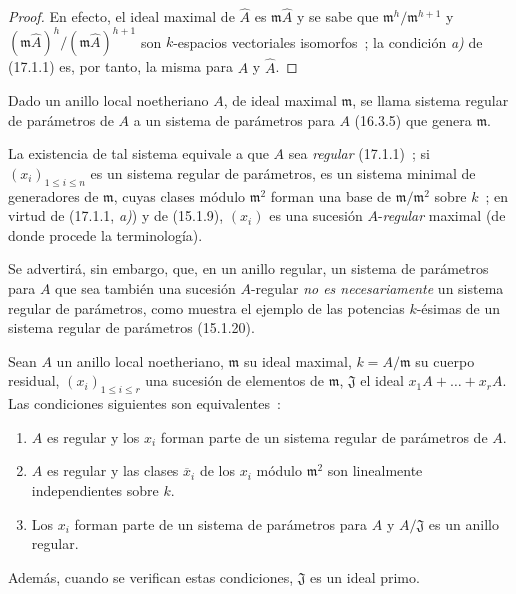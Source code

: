 \begin{proof}
En efecto, el ideal maximal de $\widehat{A}$ es $\mathfrak{m}\widehat{A}$ y se
sabe que $\mathfrak{m}^h/\mathfrak{m}^{h+1}$ y
$(\mathfrak{m}\widehat{A})^h/(\mathfrak{m}\widehat{A})^{h+1}$ son
$k$-espacios vectoriales isomorfos~; la condición \emph{a)} de (17.1.1) es, por tanto, la
misma para $A$ y $\widehat{A}$.
\end{proof}

\begin{definition}[17.1.6]
\label{0.17.1.6-es}
Dado un anillo local noetheriano $A$, de ideal maximal $\mathfrak{m}$, se
llama sistema regular de parámetros de $A$ a un sistema de parámetros
para $A$ \textup{(16.3.5)} que genera $\mathfrak{m}$.
\end{definition}

La existencia de tal sistema equivale a que $A$ sea \emph{regular} (17.1.1)~;
si $(x_i)_{1\leq i\leq n}$ es un sistema regular de parámetros, es un
sistema minimal de generadores de $\mathfrak{m}$, cuyas clases módulo
$\mathfrak{m}^2$ forman una base de $\mathfrak{m}/\mathfrak{m}^2$ sobre $k$~;
en virtud de (17.1.1, \emph{a)}) y de (15.1.9), $(x_i)$ es una sucesión $A$-\emph{regular}
maximal (de donde procede la terminología).

Se advertirá, sin embargo, que, en un anillo regular, un sistema de
parámetros para $A$ que sea también una sucesión $A$-regular \emph{no es
necesariamente} un sistema regular de parámetros, como muestra el ejemplo
de las potencias $k$-ésimas de un sistema regular de parámetros (15.1.20).

\begin{proposition}[17.1.7]
\label{0.17.1.7-es}
Sean $A$ un anillo local noetheriano, $\mathfrak{m}$ su ideal maximal,
$k=A/\mathfrak{m}$ su cuerpo residual, $(x_i)_{1\leq i\leq r}$ una sucesión
de elementos de $\mathfrak{m}$, $\mathfrak{J}$ el ideal
$x_1A+\ldots+x_rA$. Las condiciones siguientes son equivalentes~:
\begin{enumerate}
  \item[\rm a)] $A$ es regular y los $x_i$ forman parte de un sistema
  regular de parámetros de $A$.
  \item[\rm a')] $A$ es regular y las clases $\overline{x}_i$ de los $x_i$
  \textup{módulo} $\mathfrak{m}^2$ son linealmente independientes sobre $k$.
  \item[\rm b)] Los $x_i$ forman parte de un sistema de parámetros para $A$ y
  $A/\mathfrak{J}$ es un anillo regular.
\end{enumerate}
Además, cuando se verifican estas condiciones, $\mathfrak{J}$ es un ideal
primo.
\end{proposition}

